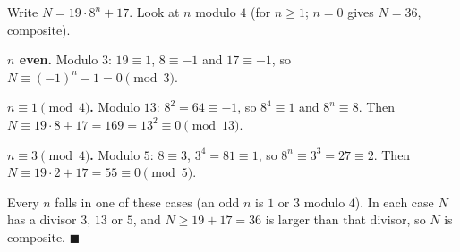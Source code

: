 Write $N=19\cdot8^n+17$. Look at $n$ modulo $4$ (for $n\ge1$; $n=0$ gives $N=36$, composite).

\textbf{$n$ even.} Modulo $3$: $19\equiv1$, $8\equiv-1$ and $17\equiv-1$, so $N\equiv(-1)^n-1=0\pmod3$.

\textbf{$n\equiv1\pmod4$.} Modulo $13$: $8^2=64\equiv-1$, so $8^4\equiv1$ and $8^n\equiv8$. Then $N\equiv19\cdot8+17=169=13^2\equiv0\pmod{13}$.

\textbf{$n\equiv3\pmod4$.} Modulo $5$: $8\equiv3$, $3^4=81\equiv1$, so $8^n\equiv3^3=27\equiv2$. Then $N\equiv19\cdot2+17=55\equiv0\pmod5$.

Every $n$ falls in one of these cases (an odd $n$ is $1$ or $3$ modulo $4$). In each case $N$ has a divisor $3$, $13$ or $5$, and $N\ge19+17=36$ is larger than that divisor, so $N$ is composite. $\blacksquare$
